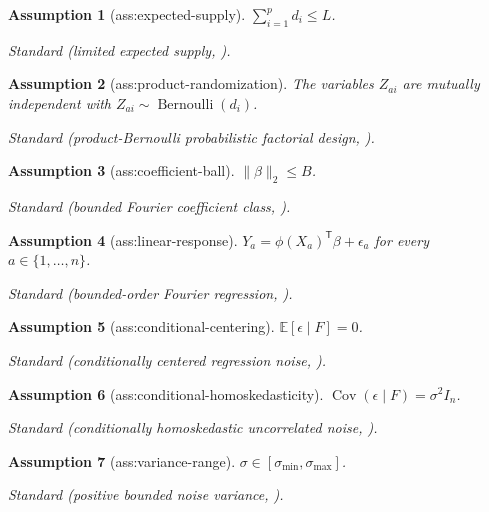 \documentclass{article}
\newtheorem{assumption}{Assumption}
\begin{document}
\begin{assumption}[ass:expected-supply]\label{ass:expected-supply}
\(\sum_{i=1}^p d_i\le L\).
\par\smallskip\noindent\emph{Standard} (limited expected supply, \cite{ShyamalZhangUhler2025}).
\end{assumption}

\begin{assumption}[ass:product-randomization]\label{ass:product-randomization}
The variables \(Z_{ai}\) are mutually independent with \(Z_{ai}\sim\operatorname{Bernoulli}(d_i)\).
\par\smallskip\noindent\emph{Standard} (product-Bernoulli probabilistic factorial design, \cite{ShyamalZhangUhler2025}).
\end{assumption}

\begin{assumption}[ass:coefficient-ball]\label{ass:coefficient-ball}
\(\|\beta\|_2\le B\).
\par\smallskip\noindent\emph{Standard} (bounded Fourier coefficient class, \cite{ShyamalZhangUhler2025}).
\end{assumption}

\begin{assumption}[ass:linear-response]\label{ass:linear-response}
\(Y_a=\phi(X_a)^{\mathsf T}\beta+\epsilon_a\) for every \(a\in\{1,\ldots,n\}\).
\par\smallskip\noindent\emph{Standard} (bounded-order Fourier regression, \cite{ShyamalZhangUhler2025}).
\end{assumption}

\begin{assumption}[ass:conditional-centering]\label{ass:conditional-centering}
\(\mathbb E[\epsilon\mid F]=0\).
\par\smallskip\noindent\emph{Standard} (conditionally centered regression noise, \cite{HsuKakadeZhang2014}).
\end{assumption}

\begin{assumption}[ass:conditional-homoskedasticity]\label{ass:conditional-homoskedasticity}
\(\operatorname{Cov}(\epsilon\mid F)=\sigma^2I_n\).
\par\smallskip\noindent\emph{Standard} (conditionally homoskedastic uncorrelated noise, \cite{ShyamalZhangUhler2025}).
\end{assumption}

\begin{assumption}[ass:variance-range]\label{ass:variance-range}
\(\sigma\in[\sigma_{\min},\sigma_{\max}]\).
\par\smallskip\noindent\emph{Standard} (positive bounded noise variance, \cite{HsuKakadeZhang2014}).
\end{assumption}
\end{document}

